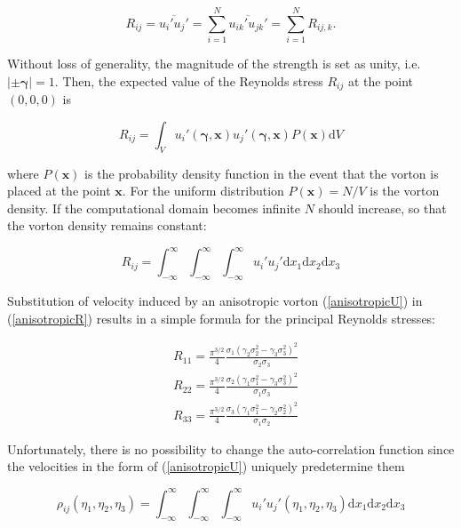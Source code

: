 \begin{equation}
	R_{ij} = \overline{u_i'u_j'} = \sum_{i=1}^{N}\overline{u_{ik}'u_{jk}'} = \sum_{i=1}^{N}R_{ij,k}.
\end{equation}


\noindent Without loss of generality, the magnitude of the strength is set as unity, i.e. $|\pm\boldsymbol{\gamma}|=1$. Then, the expected value of the Reynolds stress $R_{ij}$ at the point $(0,0,0)$ is

\begin{equation}
	R_{ij} = \int_V u_i'(\boldsymbol{\gamma},\boldsymbol{x})u_j'(\boldsymbol{\gamma},\boldsymbol{x})P(\boldsymbol{x})\mathrm{d}V
\end{equation}

\noindent where $P(\boldsymbol{x})$ is the probability density function in the event that the vorton is placed at the point $\boldsymbol{x}$. For the uniform distribution $P(\boldsymbol{x}) = N/V$ is the vorton density. If the computational domain becomes infinite $N$ should increase, so that the vorton density remains constant:

\begin{equation} \label{anisotropicR}
	R_{ij} = \int_{-\infty}^{\infty}\int_{-\infty}^{\infty}\int_{-\infty}^{\infty}u_i'u_j'\mathrm{d}x_1\mathrm{d}x_2\mathrm{d}x_3
\end{equation}

\noindent Substitution of velocity induced by an anisotropic vorton (\ref{anisotropicU}) in (\ref{anisotropicR}) results in a simple formula for the principal Reynolds stresses:

\begin{equation}
	\begin{split}
		&R_{11} = \frac{\pi^{3/2}}{4} \frac{\sigma_1(\gamma_2\sigma_2^2-\gamma_3\sigma_3^2)^2}{\sigma_2\sigma_3} \\
		&R_{22} = \frac{\pi^{3/2}}{4} \frac{\sigma_2(\gamma_1\sigma_1^2-\gamma_3\sigma_3^2)^2}{\sigma_1\sigma_3} \\
		&R_{33} = \frac{\pi^{3/2}}{4} \frac{\sigma_3(\gamma_1\sigma_1^2-\gamma_2\sigma_2^2)^2}{\sigma_1\sigma_2}
	\end{split}
\end{equation}

\noindent Unfortunately, there is no possibility to change the auto-correlation function since the velocities in the form of (\ref{anisotropicU}) uniquely predetermine them

\begin{equation}
	\rho_{ij}(\eta_1,\eta_2,\eta_3) = \int_{-\infty}^{\infty}\int_{-\infty}^{\infty}\int_{-\infty}^{\infty} u_i'u_j'(\eta_1,\eta_2,\eta_3) \mathrm{d}x_1\mathrm{d}x_2\mathrm{d}x_3
\end{equation}

